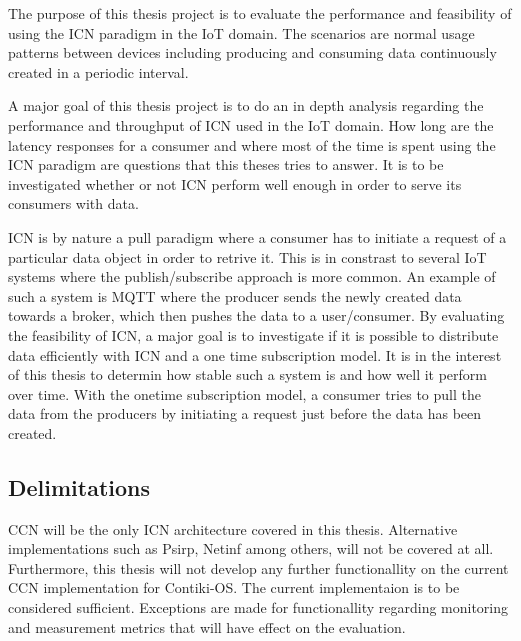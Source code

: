 The purpose of this thesis project is to evaluate the performance and feasibility of using the ICN paradigm in the IoT domain. The scenarios are normal usage patterns between devices including producing and consuming data continuously created in a periodic interval. 

A major goal of this thesis project is to do an in depth analysis regarding the performance and throughput of ICN used in the IoT domain. How long are the latency responses for a consumer and where most of the time is spent using the ICN paradigm are questions that this theses tries to answer. It is to be investigated whether or not ICN perform well enough in order to serve its consumers with data.

ICN is by nature a pull paradigm where a consumer has to initiate a request of a particular data object in order to retrive it. This is in constrast to several IoT systems where the publish/subscribe approach is more common. An example of such a system is MQTT \cite{mqtt} where the producer sends the newly created data towards a broker, which then pushes the data to a user/consumer. %
By evaluating the feasibility of ICN, a major goal is to investigate if it is possible to distribute data efficiently with ICN and a one time subscription model. It is in the interest of this thesis to determin how stable such a system is and how well it perform over time. With the onetime subscription model, a consumer tries to pull the data from the producers by initiating a request just before the data has been created. 



\subsection{Delimitations}
CCN will be the only ICN architecture covered in this thesis. Alternative implementations such as Psirp, Netinf among others, will not be covered at all.
Furthermore, this thesis will not develop any further functionallity on the current CCN implementation for Contiki-OS. The current implementaion is to be considered sufficient. Exceptions are made for functionallity regarding monitoring and measurement metrics that will have effect on the evaluation. 

